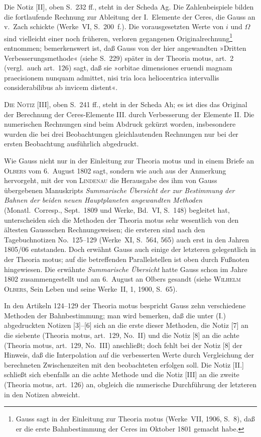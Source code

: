 \documentclass[12pt,a4paper]{article}
\theoremstyle{plain}
\theoremstyle{definition}
\theoremstyle{remark}
\begin{document}
Die Notiz [II], oben S.~232 ff., steht in der Scheda Ag. Die Zahlenbeispiele bilden die fortlaufende Rechnung zur Ableitung der I.~Elemente der Ceres, die Gauss an v.~Zach schickte (Werke~VI, S.~200~f.). Die vorausgesetzten Werte von $i$ und $\Omega$ sind vielleicht einer noch früheren, verloren gegangenen Originalrechnung\footnote{Gauss sagt in der Einleitung zur Theoria motus (Werke~VII, 1906, S.~8), daß er die erste Bahnbestimmung der Ceres im Oktober 1801 gemacht habe.} entnommen; bemerkenswert ist, daß Gauss von der hier angewandten »Dritten Verbesserungsmethode« (siehe S.~229) später in der Theoria motus, art.~2 (vergl.\ auch art.~126) sagt, daß sie »orbitae dimensiones eruendi magnam praecisionem nunquam admittet, nisi tria loca heliocentrica intervallis considerabilibus ab invicem distent«.

\vspace{0.5em}
\noindent\textsc{Die Notiz [III]}, oben S.~241 ff., steht in der Scheda Ah; es ist dies das Original der Berechnung der Ceres-Elemente III. durch Verbesserung der Elemente II. Die numerischen Rechnungen sind beim Abdruck gekürzt worden, insbesondere wurden die bei drei Beobachtungen gleichlautenden Rechnungen nur bei der ersten Beobachtung ausführlich abgedruckt.

Wie Gauss nicht nur in der Einleitung zur Theoria motus und in einem Briefe an \textsc{Olbers} vom 6.~August 1802 sagt, sondern wie auch aus der Anmerkung hervorgeht, mit der von \textsc{Lindenau} die Herausgabe des ihm von Gauss übergebenen Manuskripts \textit{Summarische Übersicht der zur Bestimmung der Bahnen der beiden neuen Hauptplaneten angewandten Methoden} (Monatl.\ Corresp., Sept.\ 1809 und Werke, Bd.~VI, S.~148) begleitet hat, unterscheiden sich die Methoden der Theoria motus sehr wesentlich von den ältesten Gaussschen Rechnungsweisen; die ersteren sind nach den Tagebuchnotizen No.~125--129 (Werke~XI, S.~564, 565) auch erst in den Jahren 1805/06 entstanden. Doch erwähnt Gauss auch einige der letzteren gelegentlich in der Theoria motus; auf die betreffenden Parallelstellen ist oben durch Fußnoten hingewiesen. Die erwähnte \textit{Summarische Übersicht} hatte Gauss schon im Jahre 1802 zusammengestellt und am 6.~August an Olbers gesandt (siehe \textsc{Wilhelm Olbers}, Sein Leben und seine Werke~II, 1, 1900, S.~65).

In den Artikeln 124--129 der Theoria motus bespricht Gauss zehn verschiedene Methoden der Bahnbestimmung; man wird bemerken, daß die unter (I.) abgedruckten Notizen [3]--[6] sich an die erste dieser Methoden, die Notiz [7] an die siebente (Theoria motus, art.~129, No.~II) und die Notiz [8] an die achte (Theoria motus, art.~129, No.~III) anschließt; doch fehlt bei der Notiz [8] der Hinweis, daß die Interpolation auf die verbesserten Werte durch Vergleichung der berechneten Zwischenzeiten mit den beobachteten erfolgen soll. Die Notiz [II.] schließt sich ebenfalls an die achte Methode und die Notiz [III] an die zweite (Theoria motus, art.~126) an, obgleich die numerische Durchführung der letzteren in den Notizen abweicht.
\end{document}
